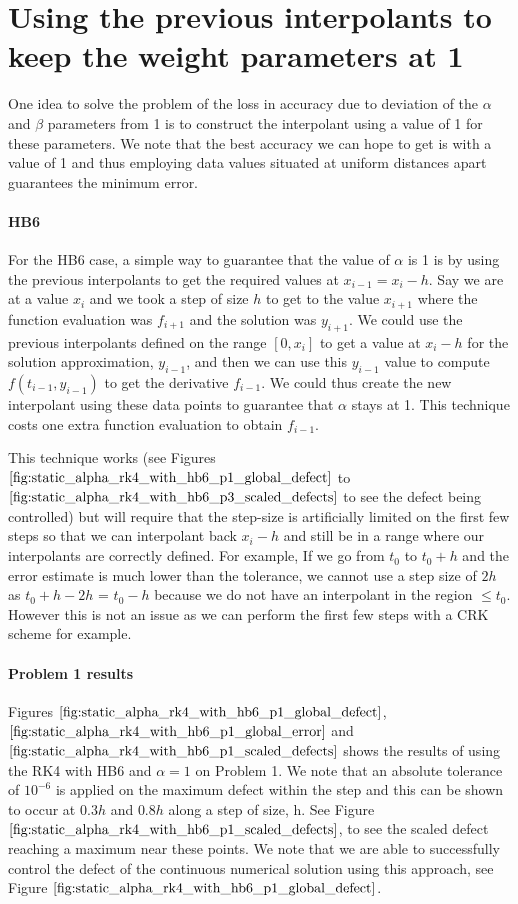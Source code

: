 
\section{Using the previous interpolants to keep the weight parameters at 1}
\label{section:keeping_alpha_at_1}
One idea to solve the problem of the loss in accuracy due to deviation of the $\alpha$ and $\beta$ parameters from 1 is to construct the interpolant using a value of 1 for these parameters. We note that the best accuracy we can hope to get is with a value of 1 and thus employing data values situated at uniform distances apart guarantees the minimum error.

\paragraph{HB6} For the HB6 case, a simple way to guarantee that the value of $\alpha$ is 1 is by using the previous interpolants to get the required values at $x_{i - 1}=x_i - h$. Say we are at a value $x_i$ and we took a step of size $h$ to get to the value $x_{i + 1}$ where the function evaluation was $f_{i + 1}$ and the solution was $y_{i + 1}$. We could use the previous interpolants defined on the range $[0, x_i]$ to get a value at $x_i - h$ for the solution approximation, $y_{i - 1}$, and then we can use this $y_{i-1}$ value to compute $f(t_{i-1}, y_{i-1})$ to get the derivative $f_{i - 1}$.  We could thus create the new interpolant using these data points to guarantee that $\alpha$ stays at 1. This technique costs one extra function evaluation to obtain $f_{i-1}$.

This technique works (see Figures $\ref{fig:static_alpha_rk4_with_hb6_p1_global_defect}$ to $\ref{fig:static_alpha_rk4_with_hb6_p3_scaled_defects}$ to see the defect being controlled) but will require that the step-size is artificially limited on the first few steps so that we can interpolant back $x_i - h$ and still be in a range where our interpolants are correctly defined. For example, If we go from $t_0$ to $t_0 + h$ and the error estimate is much lower than the tolerance, we cannot use a step size of $2h$ as $t_0 + h - 2h$ = $t_0-h$ because we do not have an interpolant in the region $\leq t_0$. However this is not an issue as we can perform the first few steps with a CRK scheme for example.

\paragraph{Problem 1 results}
Figures $\ref{fig:static_alpha_rk4_with_hb6_p1_global_defect}$, $\ref{fig:static_alpha_rk4_with_hb6_p1_global_error}$ and $\ref{fig:static_alpha_rk4_with_hb6_p1_scaled_defects}$ shows the results of using the RK4 with HB6 and $\alpha = 1$ on Problem 1. We note that an absolute tolerance of $10^{-6}$ is applied on the maximum defect within the step and this can be shown to occur at $0.3h$ and $0.8h$ along a step of size, h. See Figure $\ref{fig:static_alpha_rk4_with_hb6_p1_scaled_defects}$, to see the scaled defect reaching a maximum near these points. We note that we are able to successfully control the defect of the continuous numerical solution using this approach, see Figure $\ref{fig:static_alpha_rk4_with_hb6_p1_global_defect}$. 


